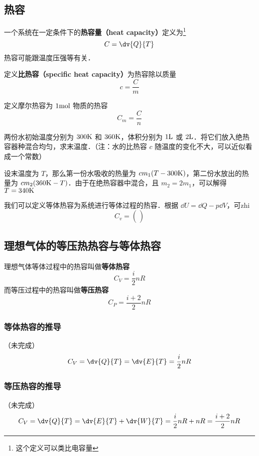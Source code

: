 
\begin{issues}
\issueTODO
\end{issues}

\subsection{热容}
一个系统在一定条件下的\textbf{热容量（heat capacity）}定义为\footnote{这个定义可以类比电容量}
\begin{equation}
C = \dv{Q}{T}
\end{equation}
热容可能跟温度压强等有关．

定义\textbf{比热容（specific heat capacity）}为热容除以质量
\begin{equation}
c = \frac{C}{m}
\end{equation}

定义摩尔热容为 $1 \rm{mol}$ 物质的热容
\begin{equation}
C_m=\frac{C}{n}
\end{equation}

\begin{example}{}
两份水初始温度分别为 $300\rm{K}$ 和 $360\rm{K}$，体积分别为 $1\rm{L}$ 或 $2 \rm{L}$．将它们放入绝热容器种混合均匀，求末温度．（注：水的比热容 $c$ 随温度的变化不大，可以近似看成一个常数）

设末温度为 $T$，那么第一份水吸收的热量为 $c m_1(T-300\rm{K})$，第二份水放出的热量为 $cm_2(360{\rm{K}}-T)$．由于在绝热容器中混合，且 $m_2=2m_1$，可以解得 $T=340\rm{K}$
\end{example}

我们可以定义等体热容为系统进行等体过程的热容．根据 $\dd U=\dd Q-p\dd V$，可zhi
\begin{equation}
C_v=\left(\frac{}{}\right)
\end{equation}

\subsection{理想气体的等压热热容与等体热容}
理想气体等体过程中的热容叫做\textbf{等体热容}
\begin{equation}\label{ThCapa_eq1}
C_V = \frac{i}{2} n R
\end{equation}
而等压过程中的热容叫做\textbf{等压热容}
\begin{equation}\label{ThCapa_eq2}
C_P = \frac{i+2}{2} n R
\end{equation}

\subsubsection{等体热容的推导}
（未完成）
\begin{equation}
C_V = \dv{Q}{T} = \dv{E}{T} = \frac{i}{2} nR
\end{equation}

\subsubsection{等压热容的推导}
（未完成）
\begin{equation}
C_V = \dv{Q}{T} = \dv{E}{T} + \dv{W}{T} = \frac{i}{2} nR + nR = \frac{i+2}{2} nR
\end{equation}

